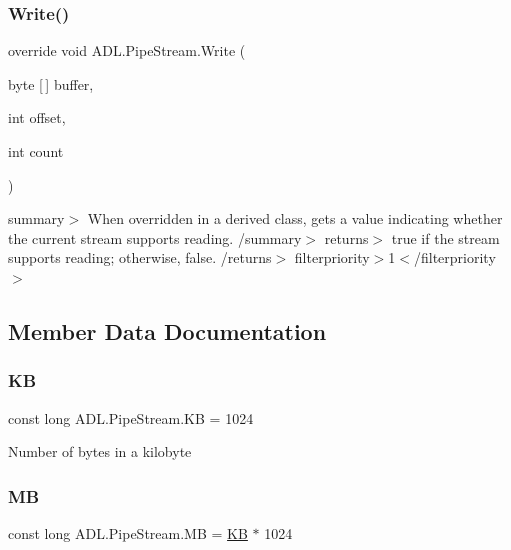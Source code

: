 \subsubsection{\texorpdfstring{Write()}{Write()}}
{\footnotesize\ttfamily override void A\+D\+L.\+Pipe\+Stream.\+Write (\begin{DoxyParamCaption}\item[{byte \mbox{[}$\,$\mbox{]}}]{buffer,  }\item[{int}]{offset,  }\item[{int}]{count }\end{DoxyParamCaption})}

summary$>$ When overridden in a derived class, gets a value indicating whether the current stream supports reading. /summary$>$ returns$>$ true if the stream supports reading; otherwise, false. /returns$>$ filterpriority$>$1$<$/filterpriority$>$ 

\subsection{Member Data Documentation}
\mbox{\label{class_a_d_l_1_1_pipe_stream_a497552b08f4c042b6a9d2c6be350181e}} 
\subsubsection{\texorpdfstring{KB}{KB}}
{\footnotesize\ttfamily const long A\+D\+L.\+Pipe\+Stream.\+KB = 1024}



Number of bytes in a kilobyte 

\mbox{\label{class_a_d_l_1_1_pipe_stream_ad4a04360b3d017567a0fd48defd434d0}} 
\subsubsection{\texorpdfstring{MB}{MB}}
{\footnotesize\ttfamily const long A\+D\+L.\+Pipe\+Stream.\+MB = \mbox{\hyperlink{class_a_d_l_1_1_pipe_stream_a497552b08f4c042b6a9d2c6be350181e}{KB}} $\ast$ 1024}



